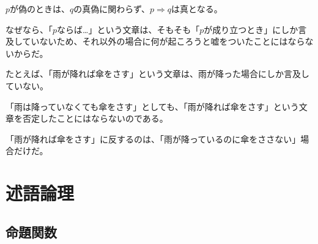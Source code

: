 \documentclass[../../imaging-math]{subfiles}
\begin{document}
$p$が偽のときは、$q$の真偽に関わらず、$p \Rightarrow q$は真となる。

なぜなら、「$p$ならば…」という文章は、そもそも「$p$が成り立つとき」にしか言及していないため、それ以外の場合に何が起ころうと嘘をついたことにはならないからだ。

\br

たとえば、「雨が降れば傘をさす」という文章は、雨が降った場合にしか言及していない。

「雨は降っていなくても傘をさす」としても、「雨が降れば傘をさす」という文章を否定したことにはならないのである。

「雨が降れば傘をさす」に反するのは、「雨が降っているのに傘をささない」場合だけだ。

\section{述語論理}

\subsection{命題関数}
\end{document}
